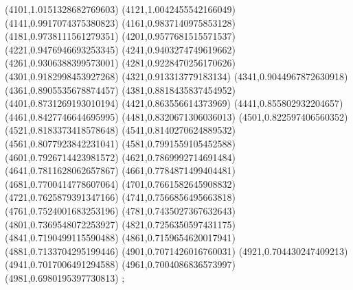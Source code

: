 {(4101,1.0151328682769603)
(4121,1.0042455542166049)
(4141,0.9917074375380823)
(4161,0.9837140975853128)
(4181,0.9738111561279351)
(4201,0.9577681515571537)
(4221,0.9476946693253345)
(4241,0.9403274749619662)
(4261,0.9306388399573001)
(4281,0.9228470256170626)
(4301,0.9182998453927268)
(4321,0.913313779183134)
(4341,0.9044967872630918)
(4361,0.8905535678874457)
(4381,0.8818435837454952)
(4401,0.8731269193010194)
(4421,0.863556614373969)
(4441,0.855802932204657)
(4461,0.8427746644695995)
(4481,0.8320671306036013)
(4501,0.822597406560352)
(4521,0.8183373418578648)
(4541,0.8140270624889532)
(4561,0.8077923842231041)
(4581,0.7991559105452588)
(4601,0.7926714423981572)
(4621,0.7869992714691484)
(4641,0.7811628062657867)
(4661,0.7784871499404481)
(4681,0.7700414778607064)
(4701,0.7661582645908832)
(4721,0.7625879391347166)
(4741,0.7566856495663818)
(4761,0.7524001683253196)
(4781,0.7435027367632643)
(4801,0.7369548072253927)
(4821,0.7256350597431175)
(4841,0.7190499115590488)
(4861,0.7159654620017941)
(4881,0.7133704295199446)
(4901,0.7071426016760031)
(4921,0.704430247409213)
(4941,0.7017006491294588)
(4961,0.7004086836573997)
(4981,0.6980195397730813)
};
